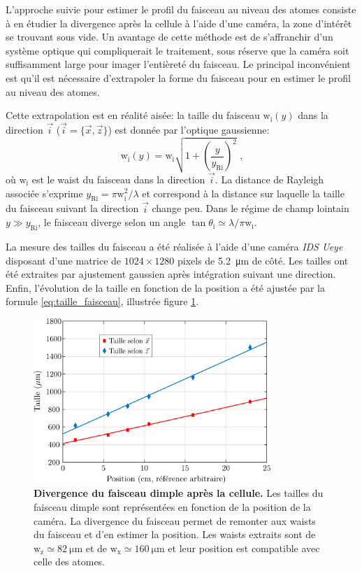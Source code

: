 L'approche suivie pour estimer le profil du faisceau au niveau des atomes consiste à en étudier la divergence après la cellule à l'aide d'une caméra, la zone d'intérêt se trouvant sous vide. Un avantage de cette méthode est de s'affranchir d'un système optique qui compliquerait le traitement, sous réserve que la caméra soit suffisamment large pour imager l'entièreté du faisceau. Le principal inconvénient est qu'il est nécessaire d'extrapoler la forme du faisceau pour en estimer le profil au niveau des atomes.

Cette extrapolation est en réalité aisée: la taille du faisceau $\mathrm{w}_{\mathrm{i}}(y)$ dans la direction $\vec{i}$ ($\vec{i}= \lbrace \vec{x},\vec{z} \rbrace$) est donnée par l'optique gaussienne:
\begin{equation}
\mathrm{w}_{\mathrm{i}}(y)=\mathrm{w}_{\mathrm{i}} \sqrt{1+\left( \frac{y}{y_{\mathrm{Ri}}} \right)^2} \text{ ,}
\label{eq:taille_faisceau}
\end{equation}
où $\mathrm{w}_{\mathrm{i}}$ est le waist du faisceau dans la direction $\vec{i}$. La distance de Rayleigh associée s'exprime $y_{\mathrm{Ri}}=\pi \mathrm{w}_{\mathrm{i}}^2 / \lambda$ et correspond à la distance sur laquelle la taille du faisceau suivant la direction $\vec{i}$ change peu. Dans le régime de champ lointain $y \gg y_{\mathrm{Ri}}$, le faisceau diverge selon un angle $\tan \theta_{\mathrm{i}} \simeq \lambda / \pi \mathrm{w}_{\mathrm{i}}$.

La mesure des tailles du faisceau a été réalisée à l'aide d'une caméra \emph{IDS Ueye} disposant d'une matrice de $1024 \times 1280$ pixels de \SI{5.2}{\micro\metre} de côté. Les tailles ont été extraites par ajustement gaussien après intégration suivant une direction. Enfin, l'évolution de la taille en fonction de la position a été ajustée par la formule \ref{eq:taille_faisceau}, illustrée figure \ref{fig:taille_dimple}.

\begin{figure}
\centering
\includegraphics[width=0.8\textwidth]{../Fig/Modif_exp/expansion_dimple.pdf}
\caption{\textbf{Divergence du faisceau dimple après la cellule.} Les tailles du faisceau dimple sont représentées en fonction de la position de la caméra. La divergence du faisceau permet de remonter aux waists du faisceau et d'en estimer la position. Les waists extraits sont de $\mathrm{w_z}\simeq \SI{82}{\micro\metre}$ et de $\mathrm{w_x}\simeq \SI{160}{\micro\metre}$ et leur position est compatible avec celle des atomes.}
\label{fig:taille_dimple}
\end{figure}

